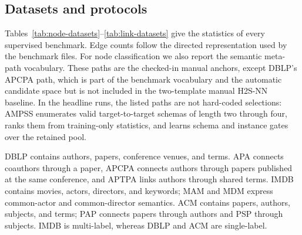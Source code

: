 \subsection{Datasets and protocols}

Tables~\ref{tab:node-datasets}--\ref{tab:link-datasets} give the statistics of every supervised
benchmark. Edge counts follow the directed representation used by the benchmark files. For node
classification we also report the semantic meta-path vocabulary. These paths are the checked-in
manual anchors, except DBLP's APCPA path, which is part of the benchmark vocabulary and the
automatic candidate space but is not included in the two-template manual H2S-NN baseline. In the
headline \ampss{} runs, the listed paths are not hard-coded selections: AMPSS enumerates valid
target-to-target schemas of length two through four, ranks them from training-only statistics, and
learns schema and instance gates over the retained pool.

\begin{table}[H]
  \centering
  \caption{Node-classification datasets and their semantic meta-path vocabulary.}
  \label{tab:node-datasets}
  \scriptsize
\end{table}

DBLP contains authors, papers, conference venues, and terms. APA connects coauthors through a
paper, APCPA connects authors through papers published at the same conference, and APTPA links
authors through shared terms. IMDB contains movies, actors, directors, and keywords; MAM and MDM
express common-actor and common-director semantics. ACM contains papers, authors, subjects, and
terms; PAP connects papers through authors and PSP through subjects. IMDB is multi-label, whereas
DBLP and ACM are single-label.

